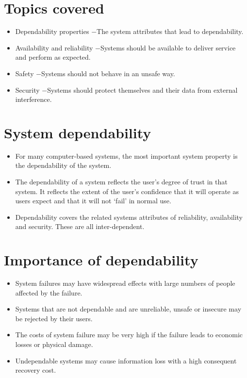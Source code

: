 \section{Topics covered}
\begin{itemize}

\item Dependability properties
\newline $-$The system attributes that lead to dependability.
\item Availability and reliability
\newline $-$Systems should be available to deliver service and perform as expected.
\item Safety
\newline $-$Systems should not behave in an unsafe way.
\item Security
\newline $-$Systems should protect themselves and their data from external interference.

\end{itemize}

\section{System dependability}
\begin{itemize}
\item For many computer-based systems, the most important system property is the dependability of the system.

\item The dependability of a system reflects the user’s degree of trust in that system. It reflects the extent of the user’s confidence that it will operate as users expect and that it will not ‘fail’ in normal use.

\item Dependability covers the related systems attributes of reliability, availability and security. These are all inter-dependent.
\end{itemize}

\section{Importance of dependability}
\begin{itemize}
\item System failures may have widespread effects with large numbers of people affected by the failure.
\item Systems that are not dependable and are unreliable, unsafe or insecure may be rejected by their users.
\item The costs of system failure may be very high if the failure leads to economic losses or physical damage.
\item Undependable systems may cause information loss with a high consequent recovery cost.
\end{itemize}

